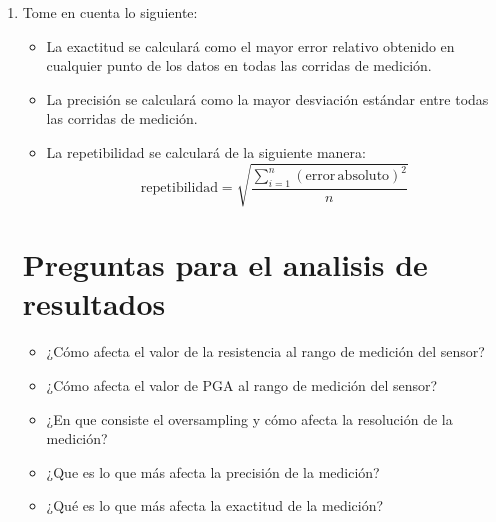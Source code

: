 \begin{enumerate}
    \item Tome en cuenta lo siguiente:
        \begin{itemize}
            \item La exactitud se calculará como el mayor error relativo obtenido en cualquier punto de los datos en todas las corridas de medición.
            \item La precisión se calculará como la mayor desviación estándar entre todas las corridas de medición.
            \item La repetibilidad se calculará de la siguiente manera:
            \begin{equation*}
                \mathrm{repetibilidad} = \sqrt{\dfrac{\sum_{i=1}^n(\mathrm{error\,absoluto})^2}{n}}
            \end{equation*}
        \end{itemize}


    \section{Preguntas para el analisis de resultados}
    \begin{itemize}
        \item ¿Cómo afecta el valor de la resistencia al rango de medición del sensor?
        \item ¿Cómo afecta el valor de PGA al rango de medición del sensor? 
        \item ¿En que consiste el oversampling y cómo afecta la resolución de la medición?
        \item ¿Que es lo que más afecta la precisión de la medición?
        \item ¿Qué es lo que más afecta la exactitud de la medición?
    \end{itemize}
\end{enumerate}
